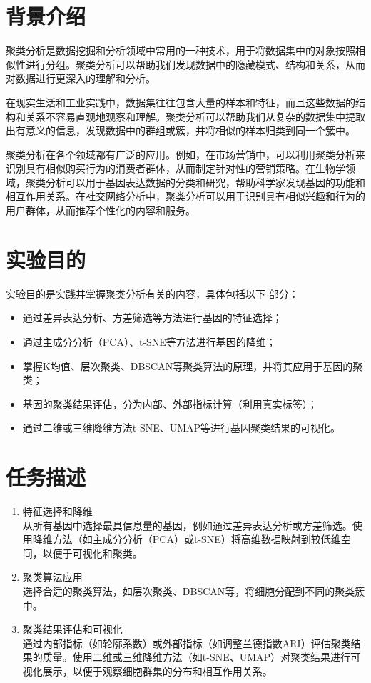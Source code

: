 \documentclass {article}
\begin{document}
	\maketitle{}	
	\section{背景介绍}
	聚类分析是数据挖掘和分析领域中常用的一种技术，用于将数据集中的对象按照相似性进行分组。聚类分析可以帮助我们发现数据中的隐藏模式、结构和关系，从而对数据进行更深入的理解和分析。
	
	在现实生活和工业实践中，数据集往往包含大量的样本和特征，而且这些数据的结构和关系不容易直观地观察和理解。聚类分析可以帮助我们从复杂的数据集中提取出有意义的信息，发现数据中的群组或簇，并将相似的样本归类到同一个簇中。
	
	聚类分析在各个领域都有广泛的应用。例如，在市场营销中，可以利用聚类分析来识别具有相似购买行为的消费者群体，从而制定针对性的营销策略。在生物学领域，聚类分析可以用于基因表达数据的分类和研究，帮助科学家发现基因的功能和相互作用关系。在社交网络分析中，聚类分析可以用于识别具有相似兴趣和行为的用户群体，从而推荐个性化的内容和服务。
	
	\section{实验目的}
	实验目的是实践并掌握聚类分析有关的内容，具体包括以下 部分：
	\begin{itemize}
		\item 通过差异表达分析、方差筛选等方法进行基因的特征选择；
		\item 通过主成分分析（PCA）、t-SNE等方法进行基因的降维；
		\item 掌握K均值、层次聚类、DBSCAN等聚类算法的原理，并将其应用于基因的聚类；
		\item 基因的聚类结果评估，分为内部、外部指标计算（利用真实标签）；
		\item 通过二维或三维降维方法t-SNE、UMAP等进行基因聚类结果的可视化。
	\end{itemize}	
	
	\section{任务描述}
	\begin{enumerate}
		\item 特征选择和降维 \\
		从所有基因中选择最具信息量的基因，例如通过差异表达分析或方差筛选。使用降维方法（如主成分分析（PCA）或t-SNE）将高维数据映射到较低维空间，以便于可视化和聚类。
		\item 聚类算法应用 \\
		选择合适的聚类算法，如层次聚类、DBSCAN等，将细胞分配到不同的聚类簇中。
		\item 聚类结果评估和可视化 \\
		通过内部指标（如轮廓系数）或外部指标（如调整兰德指数ARI）评估聚类结果的质量。使用二维或三维降维方法（如t-SNE、UMAP）对聚类结果进行可视化展示，以便于观察细胞群集的分布和相互作用关系。 
	\end{enumerate}
	
\end{document}
